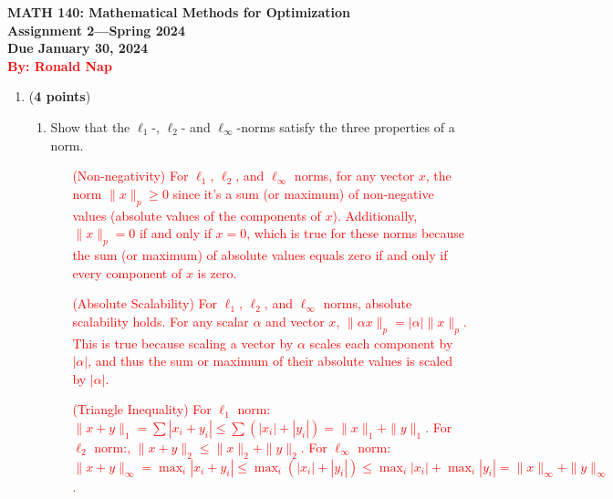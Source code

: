 \documentclass[11pt]{article}
\begin{document}
\pagestyle{empty}

\begin{center}
{\large {\bf MATH 140: Mathematical Methods for Optimization}}\\
{\bf Assignment 2---Spring 2024}\\
{\bf Due January 30, 2024} \\
{\bf \textcolor{red}{By: Ronald Nap}}
\end{center}

\begin{enumerate}

\item ({\bf 4 points})
  \begin{enumerate}
  \item Show that the $\ell_1$-, $\ell_2$- and $\ell_{\infty}$-norms satisfy the three properties of a norm.\\[-.25cm]
  
\begin{enumerate}
    \begin{enumerate}
        \item[\textcolor{red}{(Non-negativity)}] 
            \textcolor{red}{For \(\ell_1\), \(\ell_2\), and \(\ell_\infty\) norms, for any vector \(x\), the norm \(\|x\|_p \geq 0\) since it's a sum (or maximum) of non-negative values (absolute values of the components of \(x\)). Additionally, \(\|x\|_p = 0\) if and only if \(x = 0\), which is true for these norms because the sum (or maximum) of absolute values equals zero if and only if every component of \(x\) is zero.}

        \item[\textcolor{red}{(Absolute Scalability)}]
            \textcolor{red}{For \(\ell_1\), \(\ell_2\), and \(\ell_\infty\) norms, absolute scalability holds. For any scalar \(\alpha\) and vector \(x\), \(\|\alpha x\|_p = |\alpha| \|x\|_p\). This is true because scaling a vector by \(\alpha\) scales each component by \(|\alpha|\), and thus the sum or maximum of their absolute values is scaled by \(|\alpha|\).}

        \item[\textcolor{red}{(Triangle Inequality)}]
            \textcolor{red}{For \(\ell_1\) norm: \(\|x + y\|_1 = \sum |x_i + y_i| \leq \sum (|x_i| + |y_i|) = \|x\|_1 + \|y\|_1\).}
            \textcolor{red}{For \(\ell_2\) norm:, \(\|x + y\|_2 \leq \|x\|_2 + \|y\|_2\).}
            \textcolor{red}{For \(\ell_\infty\) norm: \(\|x + y\|_\infty = \max_i |x_i + y_i| \leq \max_i (|x_i| + |y_i|) \leq \max_i |x_i| + \max_i |y_i| = \|x\|_\infty + \|y\|_\infty\).}
    \end{enumerate}
\end{enumerate}


\end{enumerate}
\end{enumerate}
\end{document}

